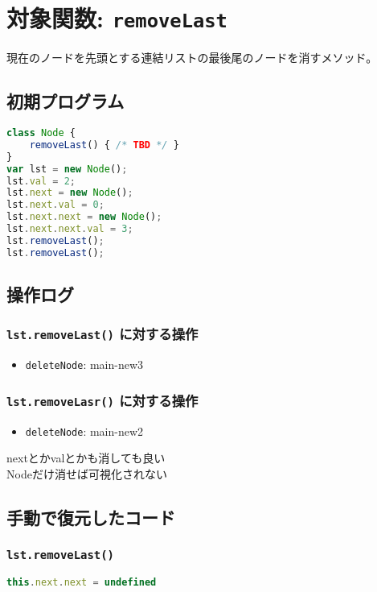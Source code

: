 \documentclass{article}
\begin{document}


\section{対象関数: \texttt{removeLast}}
現在のノードを先頭とする連結リストの最後尾のノードを消すメソッド。

\subsection{初期プログラム}

\begin{lstlisting}[language=JavaScript]
class Node {
    removeLast() { /* TBD */ }
}
var lst = new Node(); 
lst.val = 2;
lst.next = new Node();
lst.next.val = 0;
lst.next.next = new Node();
lst.next.next.val = 3;
lst.removeLast();
lst.removeLast();
\end{lstlisting}

\subsection{操作ログ}

\subsubsection{\texttt{lst.removeLast()} に対する操作}
\begin{itemize}
  \item \texttt{deleteNode}: main-new3
\end{itemize}

\subsubsection{\texttt{lst.removeLasr()} に対する操作}
\begin{itemize}
  \item \texttt{deleteNode}: main-new2
\end{itemize}

nextとかvalとかも消しても良い  \\
Nodeだけ消せば可視化されない

\subsection{手動で復元したコード}

\subsubsection{\texttt{lst.removeLast()}}
\begin{lstlisting}[language=JavaScript]
this.next.next = undefined
\end{lstlisting}
\end{document}
